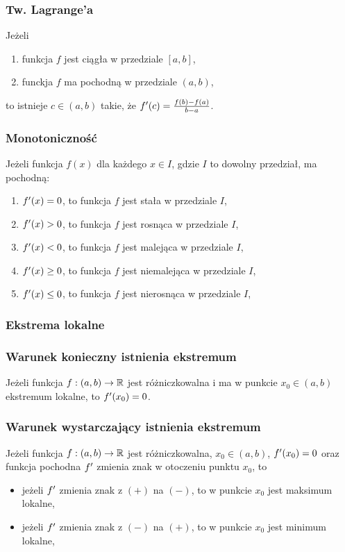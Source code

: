\documentclass[../Matematyka.tex]{subfiles}
\begin{document}
    \subsubsection{Tw. Lagrange'a}
    Jeżeli 
    \begin{enumerate}
        \item funkcja \(f\) jest ciągła w przedziale \([a, b]\),
        \item funckja \(f\) ma pochodną w przedziale \((a, b)\),
    \end{enumerate}
    to istnieje \(c \in (a, b)\) takie, że \(f^\prime(c) = \frac{f(b) - f(a)}{b - a}\).

    \subsubsection{Monotoniczność}
    Jeżeli funkcja \(f(x)\) dla każdego \(x \in I\), gdzie \(I\) to dowolny przedział, ma pochodną:
    \begin{enumerate}
        \item \(f^\prime(x) = 0\), to funkcja \(f\) jest stała w przedziale \(I\),
        \item \(f^\prime(x) > 0\), to funkcja \(f\) jest rosnąca w przedziale \(I\),
        \item \(f^\prime(x) < 0\), to funkcja \(f\) jest malejąca w przedziale \(I\),
        \item \(f^\prime(x) \geq 0\), to funkcja \(f\) jest niemalejąca w przedziale \(I\),
        \item \(f^\prime(x) \leq 0\), to funkcja \(f\) jest nierosnąca w przedziale \(I\),
    \end{enumerate}

    \subsubsection{Ekstrema lokalne}
    \subsubsection*{Warunek konieczny istnienia ekstremum}
    Jeżeli funkcja \(f:(a, b) \rightarrow \mathbb{R}\) jest różniczkowalna i ma w punkcie \(x_0 \in (a,b)\) ekstremum lokalne, to \(f^\prime(x_0) = 0\).

    \subsubsection*{Warunek wystarczający istnienia ekstremum}
    Jeżeli funkcja \(f:(a, b) \rightarrow \mathbb{R}\) jest różniczkowalna, \(x_0 \in (a,b)\), \(f^\prime(x_0) = 0\) oraz funkcja pochodna \(f^\prime\) zmienia znak w otoczeniu punktu \(x_0\), to
    \begin{itemize}
        \item jeżeli \(f^\prime\) zmienia znak z \((+)\) na \((-)\), to w punkcie \(x_0\) jest maksimum lokalne,
        \item jeżeli \(f^\prime\) zmienia znak z \((-)\) na \((+)\), to w punkcie \(x_0\) jest minimum lokalne,
    \end{itemize}
\end{document}
